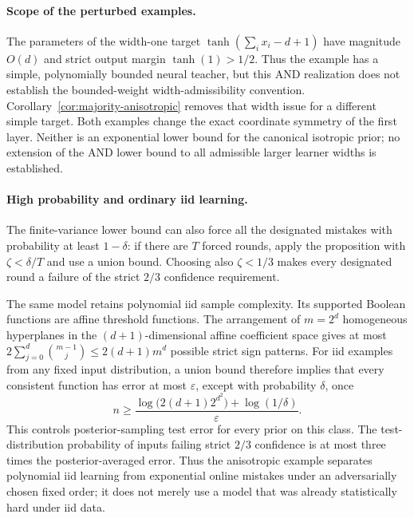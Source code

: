 \paragraph{Scope of the perturbed examples.}
The parameters of the width-one target
$\tanh(\sum_i x_i-d+1)$ have magnitude $O(d)$ and strict output margin
$\tanh(1)>1/2$. Thus the example has a simple, polynomially bounded
neural teacher, but this AND realization does not establish the
bounded-weight width-admissibility convention.
Corollary~\ref{cor:majority-anisotropic} removes that width issue for
a different simple target. Both examples change the exact coordinate
symmetry of the first layer. Neither is an exponential lower bound
for the canonical isotropic prior; no extension of the AND lower
bound to all admissible larger learner widths is established.

\paragraph{High probability and ordinary iid learning.}
The finite-variance lower bound can also force all the designated
mistakes with probability at least $1-\delta$: if there are $T$ forced
rounds, apply the proposition with $\zeta<\delta/T$ and use a union
bound. Choosing also $\zeta<1/3$ makes every designated round a failure
of the strict $2/3$ confidence requirement.

The same model retains polynomial iid sample complexity. Its supported
Boolean functions are affine threshold functions. The arrangement of
$m=2^d$ homogeneous hyperplanes in the $(d+1)$-dimensional affine
coefficient space gives at most
$2\sum_{j=0}^d\binom{m-1}{j}\le2(d+1)m^d$
possible strict sign patterns. For iid examples from any fixed input
distribution, a union bound therefore implies that every consistent
function has error at most $\varepsilon$, except with probability
$\delta$, once
\[
 n\ge\frac{\log\bigl(2(d+1)2^{d^2}\bigr)+\log(1/\delta)}
              {\varepsilon}.
\]
This controls posterior-sampling test error for every prior on this
class. The test-distribution probability of inputs failing strict $2/3$ confidence is at
most three times the posterior-averaged error. Thus the anisotropic
example separates polynomial iid learning from exponential online
mistakes under an adversarially chosen fixed order; it does not merely
use a model that was already statistically hard under iid data.
